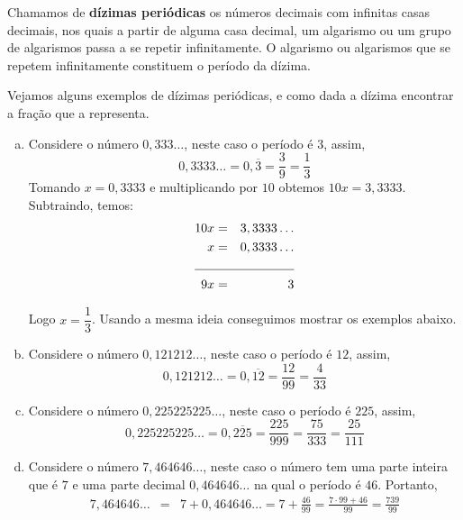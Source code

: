 \begin{obs}
    
  Chamamos de \textbf{dízimas periódicas} os números decimais com infinitas casas decimais, nos quais a partir de alguma casa decimal, um algarismo ou um grupo de algarismos passa a se repetir infinitamente. O algarismo ou algarismos que se repetem infinitamente constituem o período da dízima.

\end{obs}

 \begin{exem} Vejamos alguns exemplos de dízimas periódicas, e como dada a dízima encontrar a fração que a representa.

  \begin{enumerate}[a)]
   \item Considere o número $0,333 \ldots$, neste caso o período é $3$, assim,
\begin{equation*}
0,3333 \ldots= 0,\overline{3}= \frac{3}{9}= \frac{1}{3}
\end{equation*}
   Tomando $x = 0,3333$ e multiplicando por $10$ obtemos $10x = 3,3333$. Subtraindo, temos:
   \begin{eqnarray*}
   10x &=& 3,3333 \ldots \\
    x &=& 0,3333 \ldots\\
    \cline{1-3}
    9x &=& 3
   \end{eqnarray*}
   
   Logo $x=\dfrac{1}{3}$. Usando a mesma ideia conseguimos mostrar os exemplos abaixo.

   \item Considere o número $0,121212 \ldots$, neste caso o período é $12$, assim,
\begin{equation*}
0,121212 \ldots= 0,\overline{12}= \frac{12}{99}= \frac{4}{33}
\end{equation*}

   \item Considere o número $0,225225225 \ldots$, neste caso o período é $225$, assim,
\begin{equation*}
0,225225225 \ldots= 0,\overline{225}= \frac{225}{999}= \frac{75}{333}=\frac{25}{111}
\end{equation*}

   \item Considere o número $7,464646 \ldots$, neste caso o número tem uma parte inteira que é $7$ e uma parte decimal $0,464646 \ldots$ na qual o período é $46$. Portanto,
   \begin{eqnarray*}
    7,464646 \ldots &=& 7+0,464646 \ldots = 7 + \frac{46}{99} = \frac{7\cdot 99 + 46}{99} =  \frac{739}{99}
   \end{eqnarray*}


\end{enumerate}
\end{exem}
